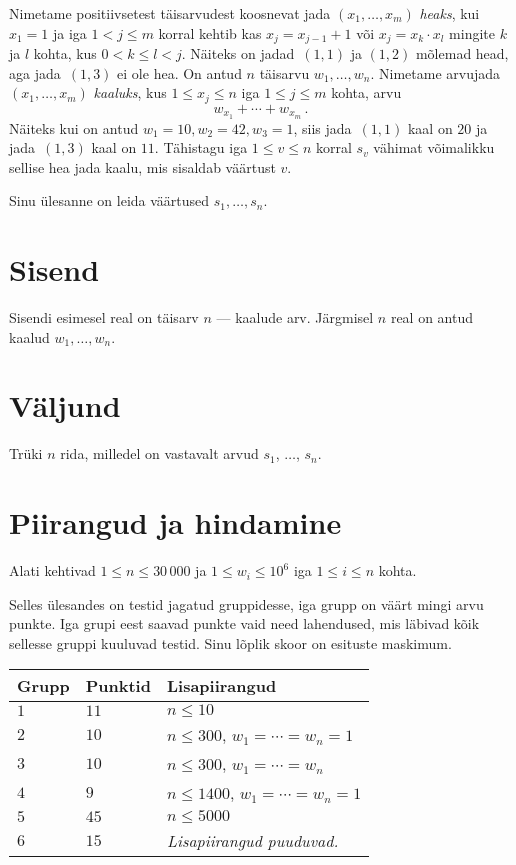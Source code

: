 
\noindent
Nimetame positiivsetest täisarvudest koosnevat jada $(x_1,\ldots,x_m)$ \emph{heaks}, kui $x_1 = 1$
ja iga $1 < j \leq m$ korral kehtib kas $x_j=x_{j-1}+1$ või $x_j=x_k\cdot x_l$ mingite $k$ ja $l$
kohta, kus $0< k\leq l< j$.
Näiteks on jadad~$(1,1)$ ja $(1,2)$ mõlemad head, aga jada~$(1,3)$ ei ole hea.
On antud $n$ täisarvu $w_1,\ldots,w_n$. Nimetame arvujada $(x_1,\ldots,x_m)$ \emph{kaaluks}, kus
$1\leq x_j \leq n$ iga $1\leq j\leq m$ kohta, arvu
\[ w_{x_1} +\cdots +w_{x_m}\,.\] 
Näiteks kui on antud $w_1=10,  w_2=42,w_3= 1$, siis jada~$(1,1)$ kaal on $20$ ja jada~$(1,3)$ kaal
on $11$.
Tähistagu iga $1\leq v\leq n$ korral $s_v$ vähimat võimalikku sellise hea jada kaalu, mis sisaldab väärtust $v$.

Sinu ülesanne on leida väärtused $s_1,\ldots ,s_n$.

\section*{Sisend}

Sisendi esimesel real on täisarv $n$ --- kaalude arv.
Järgmisel $n$ real on antud kaalud $w_1, \ldots, w_n$.

\section*{Väljund}

Trüki $n$ rida, milledel on vastavalt arvud $s_1$, $\ldots$, $s_n$.

\section*{Piirangud ja hindamine}

Alati kehtivad
$1\leq n \leq 30\,000$ %
ja
$1\leq w_i \leq 10^6$ iga $1\leq i \leq n$ kohta.%

Selles ülesandes on testid jagatud gruppidesse, iga grupp on väärt mingi arvu punkte.
Iga grupi eest saavad punkte vaid need lahendused, mis läbivad kõik sellesse gruppi kuuluvad testid.
Sinu lõplik skoor on esituste maskimum.

\medskip
\begin{tabular}{lll}
Grupp & Punktid & Lisapiirangud \\\hline
$1$   & $11$ & $n\leq 10$ \\
$2$   & $10$ & $n\leq 300$, $w_1=\cdots=w_n = 1$ \\
$3$   & $10$ & $n\leq 300$, $w_1=\cdots=w_n$ \\ %
$4$   & $9$ & $n\leq 1400$, $w_1=\cdots=w_n = 1$ \\
$5$   & $45$ & $n\leq 5000$\\
$6$   & $15$ & \emph{Lisapiirangud puuduvad.}
\end{tabular}
